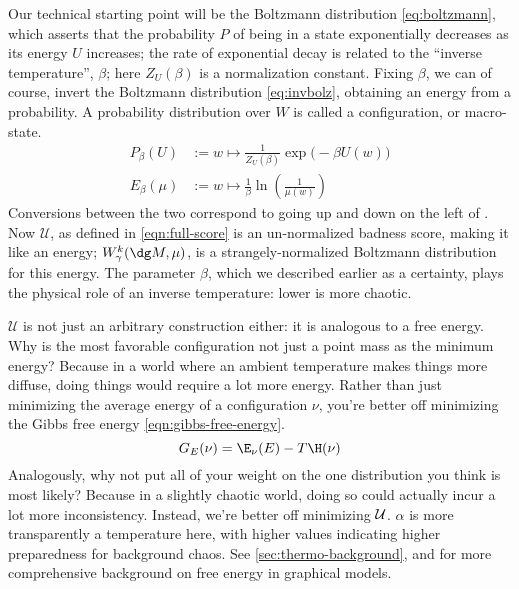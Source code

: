 Our technical starting point will be the Boltzmann distribution \eqref{eq:boltzmann}, which asserts that the probability $P$ of being in a state exponentially decreases as its energy $U$ increases; the rate of exponential decay is related to the ``inverse temperature'', $\beta$; here $Z_U(\beta)$ is a normalization constant. Fixing $\beta$, we can of course, invert the Boltzmann distribution \eqref{eq:invbolz}, obtaining an energy from a probability. A probability distribution over $W$ is called a configuration, or macro-state.
\begin{align}
 P_{\beta}(U) &:= w \mapsto  \frac{1}{Z_U(\beta)}\exp\Big(-\beta U(w)\Big) \label{eq:boltzmann} \\
	E_{\beta}(\mu) &:= w \mapsto \frac{1}{\beta} \ln \left(\frac{1}{\mu(w)}\right) \label{eq:invbolz}
\end{align}
Conversions between the two correspond to going up and down on the left of . 
Now $\mathcal U$, as defined in \eqref{eqn:full-score} is an un-normalized badness score, making it like an energy; $W^k_\gamma(\dg M, \mu)$, is a strangely-normalized Boltzmann distribution for this energy. The parameter $\beta$, which we described earlier as a certainty, plays the physical role of an inverse temperature: lower is more chaotic. 

$\mathcal U$ is not just an arbitrary construction either: it is analogous to a free energy. Why is the most favorable configuration not just a point mass as the minimum energy? Because in a world where an ambient temperature makes things more diffuse, doing things would require a lot more energy. Rather than just minimizing the average energy of a configuration $\nu$, you're better off minimizing the Gibbs free energy \eqref{eqn:gibbs-free-energy}. 
\begin{equation}
	G_E(\nu) = {\E}_\nu( E )  - T \H(\nu) \label{eqn:gibbs-free-energy}
\end{equation}
Analogously, why not put all of your weight on the one distribution you think is most likely? Because in a slightly chaotic world, doing so could actually incur a lot more inconsistency. Instead, we're better off minimizing $\cal U$. $\alpha$ is more transparently a temperature here, with higher values indicating higher preparedness for background chaos. 
%
See \ref{sec:thermo-background}, and
	\cite{bethe,friston2009free} for more comprehensive background
	on free energy 
in graphical models.

